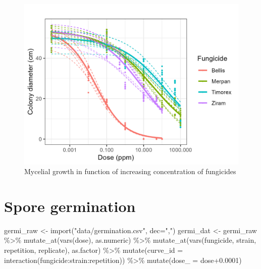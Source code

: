 \documentclass[
  letterpaper,
  DIV=11,
  numbers=noendperiod]{scrreport}
\newenvironment{Shaded}{\begin{snugshade}}{\end{snugshade}}
\newcommand{\AttributeTok}[1]{\textcolor[rgb]{0.40,0.45,0.13}{#1}}
\newcommand{\FloatTok}[1]{\textcolor[rgb]{0.68,0.00,0.00}{#1}}
\newcommand{\FunctionTok}[1]{\textcolor[rgb]{0.28,0.35,0.67}{#1}}
\newcommand{\NormalTok}[1]{\textcolor[rgb]{0.00,0.23,0.31}{#1}}
\newcommand{\OtherTok}[1]{\textcolor[rgb]{0.00,0.23,0.31}{#1}}
\newcommand{\SpecialCharTok}[1]{\textcolor[rgb]{0.37,0.37,0.37}{#1}}
\newcommand{\StringTok}[1]{\textcolor[rgb]{0.13,0.47,0.30}{#1}}
\begin{document}
\begin{figure}

{\centering \includegraphics{plots/mg_curves.jpg}

}

\caption{Mycelial growth in function of increasing concentration of
fungicides}

\end{figure}

\hypertarget{spore-germination}{%
\section{Spore germination}\label{spore-germination}}

\begin{Shaded}
\begin{Highlighting}[]
\NormalTok{germi\_raw }\OtherTok{\textless{}{-}} \FunctionTok{import}\NormalTok{(}\StringTok{"data/germination.csv"}\NormalTok{, }\AttributeTok{dec=}\StringTok{","}\NormalTok{)}
\NormalTok{germi\_dat }\OtherTok{\textless{}{-}}\NormalTok{ germi\_raw }\SpecialCharTok{\%\textgreater{}\%} 
  \FunctionTok{mutate\_at}\NormalTok{(}\FunctionTok{vars}\NormalTok{(dose), as.numeric) }\SpecialCharTok{\%\textgreater{}\%} 
  \FunctionTok{mutate\_at}\NormalTok{(}\FunctionTok{vars}\NormalTok{(fungicide, strain, repetition, replicate), as.factor) }\SpecialCharTok{\%\textgreater{}\%} 
  \FunctionTok{mutate}\NormalTok{(}\AttributeTok{curve\_id =} \FunctionTok{interaction}\NormalTok{(fungicide}\SpecialCharTok{:}\NormalTok{strain}\SpecialCharTok{:}\NormalTok{repetition)) }\SpecialCharTok{\%\textgreater{}\%} 
  \FunctionTok{mutate}\NormalTok{(}\AttributeTok{dose\_ =}\NormalTok{ dose}\FloatTok{+0.0001}\NormalTok{)}
\end{Highlighting}
\end{Shaded}
\end{document}
